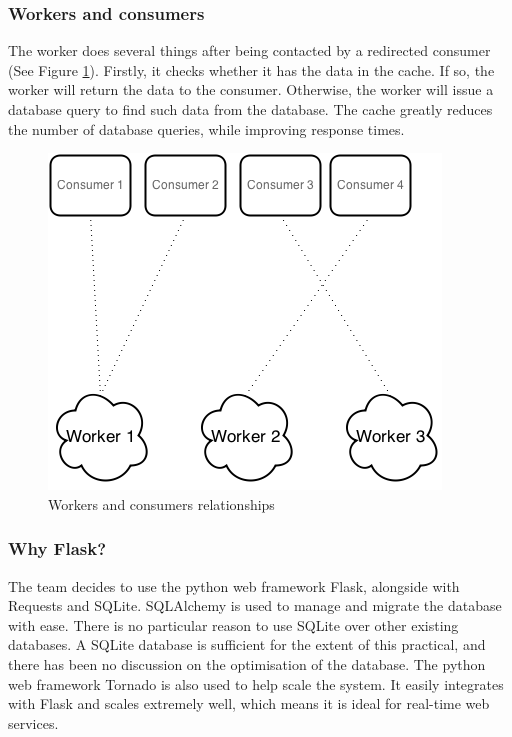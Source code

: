 \documentclass{sigchi}
\begin{document}
\subsubsection{Workers and consumers}

The worker does several things after being contacted by a redirected consumer (See Figure \ref{fig:cons_to_worker}). Firstly, it checks whether it has the data in the cache. If so, the worker will return the data to the consumer. Otherwise, the worker will issue a database query to find such data from the database. The cache greatly reduces the number of database queries, while improving response times.

\begin{figure}[!h]
\centering
\includegraphics[width=0.9\columnwidth]{img/cons_to_worker}
\caption{Workers and consumers relationships}
\label{fig:cons_to_worker}
\end{figure}

\subsubsection{Why Flask?}

The team decides to use the python web framework Flask, alongside with Requests and SQLite. SQLAlchemy is used to manage and migrate the database with ease. There is no particular reason to use SQLite over other existing databases. A SQLite database is sufficient for the extent of this practical, and there has been no discussion on the optimisation of the database. The python web framework Tornado is also used to help scale the system. It easily integrates with Flask and scales extremely well, which means it is ideal for real-time web services.
\end{document}
